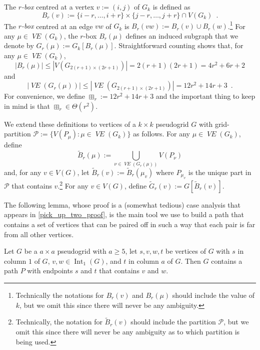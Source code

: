 \documentclass{patmorin}
\newcommand{\vol}[1]{\boxplus_{#1}}
\DeclareMathOperator{\interior}{Int}
\newcommand{\defin}[1]{\emph{\color{brightmaroon}#1}}
\DeclareMathOperator{\VE}{\mathit{VE}}
\begin{document}
The \defin{$r$-box} centred at a vertex $v:=(i,j)$ of $G_{k}$ is defined as
\[
  B_r(v) := \{i-r,\ldots,i+r\}\times\{j-r,\ldots,j+r\} \cap V(G_{k}) \enspace .
\]
The \defin{$r$-box} centred at an edge $vw$ of $G_{k}$ is $B_r(vw):=B_r(v)\cup B_r(w)$.\footnote{Technically the notations for $B_r(v)$ and $B_r(\mu)$ should include the value of $k$, but we omit this since there will never be any ambiguity.}
For any $\mu\in\VE(G_k)$, the $r$-box $B_r(\mu)$ defines an induced subgraph that we denote by $G_r(\mu):=G_{k}[B_r(\mu)]$.  Straightforward counting shows that, for any $\mu\in\VE(G_k)$,
\[
   |B_r(\mu)| \le |V(G_{2(r+1)\times (2r+1)})| = 2(r+1)(2r+1) = 4r^2+6r+2
\]
and
\begin{equation}
   |\VE(G_r(\mu))| \le |\VE(G_{2(r+1)\times (2r+1)})| = 12r^2+14r+3 \enspace . \label{rbox_size}
\end{equation}
For convenience, we define $\vol{r}:=12r^2+14r+3$ and the important thing to  keep in mind is that $\vol{r} \in\Theta(r^2)$.
%

We extend these definitions to vertices of a $k\times k$ pseudogrid $G$ with grid-partition $\mathcal{P}:=\{V(P_\mu):\mu\in\VE(G_k)\}$ as follows. For any $\mu\in\VE(G_k)$, define
\[
   \tilde{B}_r(\mu) := \bigcup_{\nu\in \VE(G_r(\mu))} V(P_\nu)
\]
and, for any $v\in V(G)$, let $\tilde{B}_r(v):=\tilde{B}_r(\mu_v)$ where $P_{\mu_v}$ is the unique part in $\mathcal{P}$ that contains $v$.\footnote{Technically, the notation for $\tilde{B}_r(v)$ should include the partition $\mathcal{P}$, but we omit this since there will never be any ambiguity as to which partition is being used.}
For any $v\in V(G)$, define $\tilde{G}_r(v):=G[\tilde{B}_r(v)]$.

The following lemma, whose proof is a (somewhat tedious) case analysis that appears in \cref{pick_up_two_proof}, is the main tool we use to build a path that contains a set of vertices that can be paired off in such a way that each pair is far from all other vertices.

\begin{lem}\label{pick_up_two}
  Let $G$ be a $a\times a$ pseudogrid with $a\ge 5$,  let $s,v,w,t$ be vertices of $G$ with $s$ in column $1$ of $G$, $v,w\in\interior_1(G)$, and $t$ in column $a$ of $G$.  Then $G$ contains a path $P$ with endpoints $s$ and $t$ that contains $v$ and $w$.
\end{lem}
\end{document}
